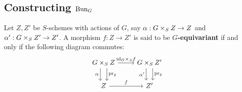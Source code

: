         \subsection{Constructing \texorpdfstring{$\mathrm{Bun}_G$}{}}
            \begin{definition}[Equivariance] \label{def: equivariance}
                Let $Z, Z'$ be $S$-schemes with actions of $G$, say $\alpha: G \x_S Z \to Z$ and $\alpha': G \x_S Z' \to Z'$. A morphism $f: Z \to Z'$ is said to be \textbf{$G$-equivariant} if and only if the following diagram commutes:
                    $$
                        \begin{tikzcd}
                    	{G \x_S Z} & {G \x_S Z'} \\
                    	Z & {Z'}
                    	\arrow["{\id_G \x_S f}", from=1-1, to=1-2]
                    	\arrow["\alpha"', shift right=2, from=1-1, to=2-1]
                    	\arrow["{\pr_2}", shift left=2, from=1-1, to=2-1]
                    	\arrow["{\pr_2}", shift left=2, from=1-2, to=2-2]
                    	\arrow["{\alpha'}"', shift right=2, from=1-2, to=2-2]
                    	\arrow["f", from=2-1, to=2-2]
                        \end{tikzcd}
                    $$
            \end{definition}
